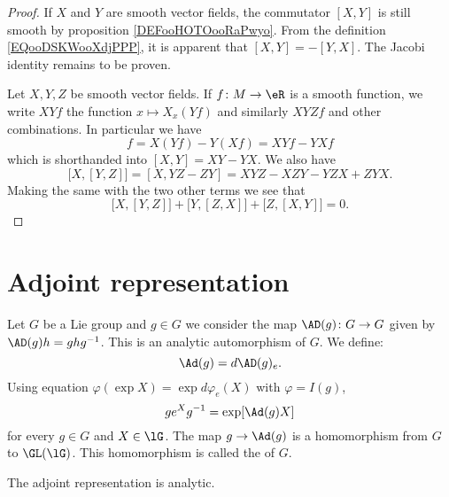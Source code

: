 \begin{proof}
	If \( X\) and \( Y\) are smooth vector fields, the commutator \( [X,Y]\) is still smooth by proposition \ref{DEFooHOTOooRaPwyo}. From the definition \eqref{EQooDSKWooXdjPPP}, it is apparent that \( [X,Y]=-[Y,X]\). The Jacobi identity remains to be proven.

	Let \( X,Y,Z\) be smooth vector fields. If \( f\colon M\to \eR\) is a smooth function, we write \( XYf\) the function \( x\mapsto X_x(Yf)\) and similarly \( XYZf\) and other combinations. In particular we have
	\begin{equation}
		[X,Y]f=X(Yf)-Y(Xf)=XYf-YXf
	\end{equation}
	which is shorthanded into \( [X,Y]=XY-YX\). We also have
	\begin{equation}
		\big[ X, [Y,Z] \big]=[X,YZ-ZY]=XYZ-XZY-YZX+ZYX.
	\end{equation}
	Making the same with the two other terms we see that
	\begin{equation}
		\big[ X,[Y,Z] \big]+\big[ Y,[Z,X] \big]+\big[ Z,[X,Y] \big]=0.
	\end{equation}
\end{proof}

\section{Adjoint representation}

Let $G$ be a Lie group and $g\in G$ we consider the map $\AD(g)\colon G\to G$ given by $\AD(g)h=g hg^{-1}$. This is an analytic automorphism of $G$. We define:
\[
	\Ad(g)=d\AD(g)_e.
\]
Using equation $\varphi(\exp X)=\exp d\varphi_e(X)$ with $\varphi=I(g)$,
\begin{equation}\label{eq:sigma_X_sigma}
	g e^{X}g^{-1}=\exp[ \Ad(g)X ]
\end{equation}
for every $g\in G$ and $X\in\lG$. The map $g\to\Ad(g)$ is a homomorphism from $G$ to $\GL(\lG)$. This homomorphism is called the  of $G$.

\begin{proposition}
	The adjoint representation is analytic.
\end{proposition}

